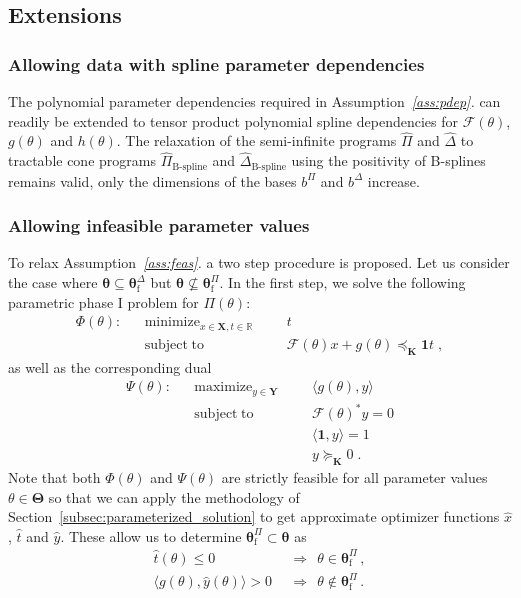 \documentclass{article}
\DeclareMathOperator*{\minimize}{minimize}
\DeclareMathOperator*{\maximize}{maximize}
\DeclareMathOperator*{\subj}{subject\;to}
\newcommand{\R}{\mathbb{R}}         %
\newcommand{\adj}{\ast}                     %
\newcommand{\feas}{\mathrm{f}}              %
\newcommand{\ppar}{\theta}                          %
\newcommand{\Ppar}{{\bm{\theta}}}                   %
\newcommand{\PPar}{{\bm{\Theta}}}                   %
\newcommand{\X}{\mathbf{X}}                         %
\newcommand{\Y}{\mathbf{Y}}                         %
\newcommand{\K}{\mathbf{K}}                         %
\newcommand{\calF}{\mathcal{F}}                     %
\newcommand{\Pfeas}{\Ppar^\Pi_\feas}                %
\newcommand{\Dfeas}{\Ppar^\Delta_\feas}             %
\newcommand{\bPi}{b^\Pi}                %
\newcommand{\bDelta}{b^\Delta}          %
\begin{document}

\subsection{Extensions}\label{subsec:extensions}

\subsubsection{Allowing data with spline parameter dependencies}

The polynomial parameter dependencies required in  Assumption~{\it{}\ref{ass:pdep}.} can readily be extended to tensor product polynomial spline dependencies for $\calF(\ppar)$, $g(\ppar)$ and $h(\ppar)$. The relaxation of the semi-infinite programs $\hat{\Pi}$ and $\hat{\Delta}$ to tractable cone programs $\hat{\Pi}_{\text{B-spline}}$ and $\hat{\Delta}_{\text{B-spline}}$ using the positivity of B-splines remains valid, only the dimensions of the bases $\bPi$ and $\bDelta$ increase.

\subsubsection{Allowing infeasible parameter values}%

To relax Assumption~{\it{}\ref{ass:feas}.} a two step procedure is proposed. Let us consider the case where $\Ppar\subseteq\Dfeas$ but $\Ppar\nsubseteq\Pfeas$. In the first step, we solve the following parametric phase I problem for $\Pi(\ppar)$:
\[ \begin{aligned}
\Phi(\ppar): && \minimize_{x\in\X, t\in\R} &&& t \\%
             && \subj                      &&& \calF(\ppar)x + g(\ppar)\preceq_\K  \mathbf{1} t \;,%
\end{aligned} \]
as well as the corresponding dual
\[ \begin{aligned}
\Psi(\ppar): && \maximize_{y\in\Y} &&& \langle g(\ppar), y \rangle \\%
             && \subj              &&& \calF(\ppar)^\adj y = 0 \\%
             &&                    &&& \langle \mathbf{1}, y \rangle = 1\\%
             &&                    &&& y \succeq_\K 0 \;.%
\end{aligned} \]
Note that both $\Phi(\ppar)$ and $\Psi(\ppar)$ are strictly feasible for all parameter values $\ppar\in\PPar$ so that we can apply the methodology of Section~\ref{subsec:parameterized_solution} to get approximate optimizer functions $\hat{x}$, $\hat{t}$ and $\hat{y}$. These allow us to determine $\Pfeas\subset\Ppar$ as
\[ \begin{aligned}
\hat{t}(\ppar) \leq 0 &~~\Rightarrow~~ \ppar\in\Pfeas \,,\\
\langle g(\ppar), \hat{y}(\ppar) \rangle > 0 &~~\Rightarrow~~ \ppar\notin\Pfeas\,.%
\end{aligned}\]
\end{document}
